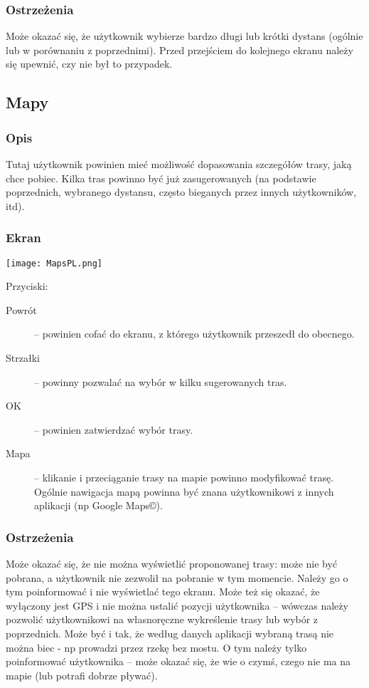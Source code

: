 \subsubsection{Ostrzeżenia}
\noindent Może okazać się, że użytkownik wybierze bardzo długi lub krótki dystans (ogólnie lub w porównaniu z poprzednimi). Przed przejściem do kolejnego ekranu należy się upewnić, czy nie był to przypadek.
\subsection{Mapy}
\subsubsection{Opis}
\noindent Tutaj użytkownik powinien mieć możliwość dopasowania szczegółów trasy, jaką chce pobiec. Kilka tras powinno być już zasugerowanych (na podstawie poprzednich, wybranego dystansu, często bieganych przez innych użytkowników, itd).
\subsubsection{Ekran}
\begin{minipage}{0.5\textwidth}
  \label{M}
  \texttt{[image: MapsPL.png]}
\end{minipage}
\begin{minipage}{0.5\textwidth}
Przyciski:\\
\begin{description}
  \item[Powrót] -- powinien cofać do ekranu, z którego użytkownik przeszedł do obecnego.
  \item[Strzałki] -- powinny pozwalać na wybór w kilku sugerowanych tras.
  \item[OK] -- powinien zatwierdzać wybór trasy.
  \item[Mapa] -- klikanie i przeciąganie trasy na mapie powinno modyfikować trasę. Ogólnie nawigacja mapą powinna być znana użytkownikowi z innych aplikacji (np Google Maps©).
\end{description}
\end{minipage}
\subsubsection{Ostrzeżenia}
\noindent Może okazać się, że nie można wyświetlić proponowanej trasy: może nie być pobrana, a użytkownik nie zezwolił na pobranie w tym momencie. Należy go o tym poinformować i nie wyświetlać tego ekranu. Może też się okazać, że wyłączony jest GPS i nie można ustalić pozycji użytkownika -- wówczas należy pozwolić użytkownikowi na własnoręczne wykreślenie trasy lub wybór z poprzednich. Może być i tak, że według danych aplikacji wybraną trasą nie można biec - np prowadzi przez rzekę bez mostu. O tym należy tylko poinformować użytkownika -- może okazać się, że wie o czymś, czego nie ma na mapie (lub potrafi dobrze pływać).

